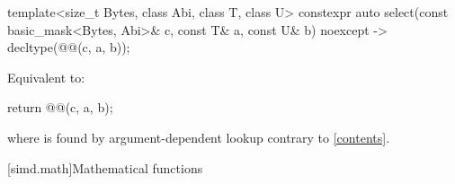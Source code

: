 \begin{itemdecl}
template<size_t Bytes, class Abi, class T, class U>
  constexpr auto select(const basic_mask<Bytes, Abi>& c, const T& a, const U& b)
  noexcept -> decltype(@@(c, a, b));
\end{itemdecl}

\begin{itemdescr}
\pnum
\effects
Equivalent to:
\begin{codeblock}
return @@(c, a, b);
\end{codeblock}
where  is found by argument-dependent
lookup contrary to \ref{contents}.
\end{itemdescr}

[simd.math]{Mathematical functions}

